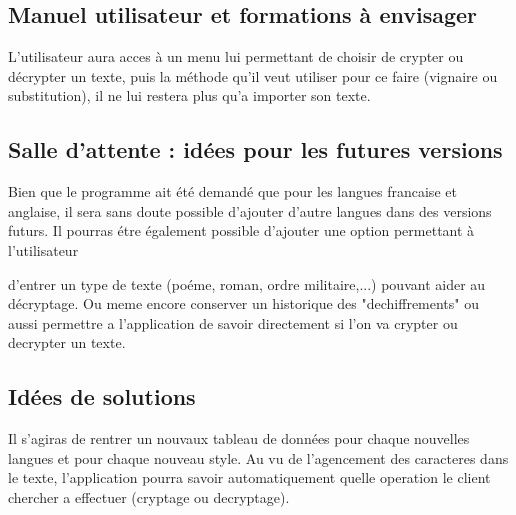 \documentclass[a4]{article}
\begin{document}
		\subsection{Manuel utilisateur et formations à envisager}
			L'utilisateur aura acces à un menu lui permettant de choisir de crypter ou décrypter un texte,
			puis la méthode qu'il veut utiliser pour ce faire (vignaire ou substitution), il ne lui restera 
			plus qu'a importer son texte.
		\subsection{Salle d’attente : idées pour les futures versions}
			Bien que le programme ait été demandé que pour les langues francaise et anglaise, 
			il sera sans doute possible d'ajouter d'autre langues dans des versions futurs. 
			Il pourras étre également possible d'ajouter une option permettant à l'utilisateur

			d'entrer un type de texte (poéme, roman, ordre militaire,...) pouvant aider au décryptage. Ou meme 				encore conserver un historique des "dechiffrements" ou aussi permettre a l'application de savoir 			directement si l'on va crypter ou decrypter un texte.

		\subsection{Idées de solutions}
		 	Il s'agiras de rentrer un nouvaux tableau de données pour chaque nouvelles langues et pour 
			chaque nouveau style.
			Au vu de l'agencement des caracteres dans le texte, l'application pourra savoir automatiquement quelle 				operation le client chercher a effectuer (cryptage ou decryptage).
\end{document}

